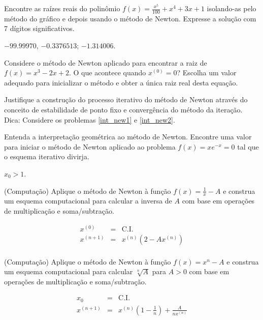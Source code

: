 \begin{exer}\label{new4} Encontre as raízes reais do polinômio $f(x)=\frac{x^5}{100}+x^4+3x+1$ isolando-as pelo método do gráfico e depois usando o método de Newton. Expresse a solução com 7 dígitos significativos.
\end{exer}
\begin{resp}
 $-99.99970$, $-0.3376513$; $-1.314006$.
 \end{resp}

\begin{exer}Considere o método de Newton aplicado para encontrar a raiz de $f(x)=x^3-2x+2$. O que acontece quando $x^{(0)}=0$? Escolha um valor adequado para inicializar o método e obter a única raiz real desta equação.
\end{exer}

\begin{exer} Justifique a construção do processo iterativo do método de Newton através do conceito de estabilidade de ponto fixo e convergência do método da iteração. Dica: Considere os problemas \ref{int_new1} e \ref{int_new2}.
\end{exer}

\begin{exer} Entenda a interpretação geométrica ao método de Newton. Encontre uma valor para iniciar o método de Newton aplicado ao problema $f(x)=xe^{-x}=0$ tal que o esquema iterativo divirja.
\end{exer}
\begin{resp}

$x_0>1$.

\end{resp}

\begin{exer}(Computação) Aplique o método de Newton à função $f(x)=\frac{1}{x}-A$ e construa um esquema computacional para calcular a inversa de $A$ com base em operações de multiplicação e soma/subtração.
 \end{exer}
\begin{resp}
  \begin{eqnarray}
 x^{(0)} &=& \text{C.I.}\\
 x^{(n+1)}&=&x^{(n)}\left(2-Ax^{(n)}\right) \\
 \end{eqnarray}
\end{resp}


\begin{exer}(Computação) Aplique o método de Newton à função $f(x)=x^n-A$ e construa um esquema computacional para calcular  $\sqrt[n]{A}$ para $A>0$ com base em operações de multiplicação e soma/subtração.
\end{exer}
\begin{resp}
 \begin{eqnarray}
 x_{0} &=& \text{C.I.}\\
 x^{(n+1)}&=&x^{(n)}\left(1-\frac{1}{n}\right) + \frac{A}{n x^{(n)}}
 \end{eqnarray}

\end{resp}


